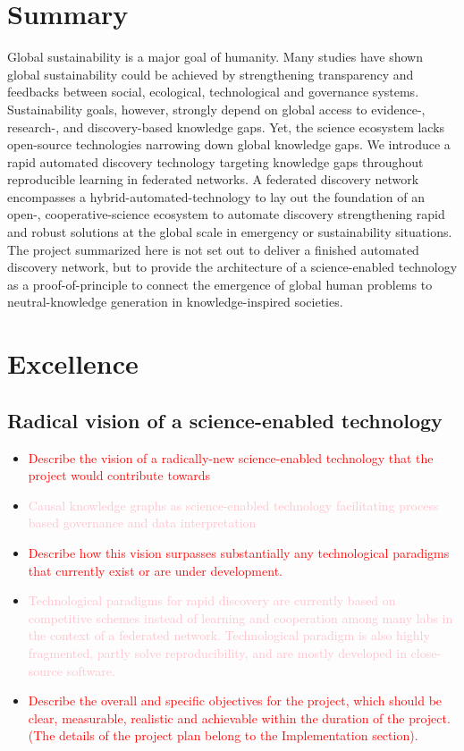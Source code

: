 \documentclass[12pt, a4paper]{article} %
\begin{document}
\section*{{\bf Summary}} Global sustainability is a major goal of
humanity. Many studies have shown global sustainability could be
achieved by strengthening transparency and feedbacks between social,
ecological, technological and governance systems. Sustainability
goals, however, strongly depend on global access to evidence-,
research-, and discovery-based knowledge gaps. Yet, the science
ecosystem lacks open-source technologies narrowing down global
knowledge gaps. We introduce a rapid automated discovery technology
targeting knowledge gaps throughout reproducible learning in federated
networks. A federated discovery network encompasses a
hybrid-automated-technology to lay out the foundation of an open-,
cooperative-science ecosystem to automate discovery strengthening
rapid and robust solutions at the global scale in emergency or
sustainability situations. The project summarized here is not set out
to deliver a finished automated discovery network, but to provide the
architecture of a science-enabled technology as a proof-of-principle
to connect the emergence of global human problems to neutral-knowledge
generation in knowledge-inspired societies.
\section{Excellence}
\subsection{Radical vision of a science-enabled technology}

\begin{itemize}
\item \textcolor{red}{Describe the vision of a radically-new science-enabled
    technology that the project would contribute towards}
\item \textcolor{pink}{Causal knowledge graphs as science-enabled
    technology facilitating process based governance and data
    interpretation}
\item \textcolor{red}{Describe how this vision surpasses substantially
    any technological paradigms that currently exist or are under
    development.}
\item \textcolor{pink}{Technological paradigms for rapid discovery are
    currently based on competitive schemes instead of learning and
    cooperation among many labs in the context of a federated
    network. Technological paradigm is also highly fragmented, partly
    solve reproducibility, and are mostly developed in close-source
    software.}
\item \textcolor{red}{Describe the overall and specific objectives for
    the project, which should be clear, measurable, realistic and
    achievable within the duration of the project. (The details of the
    project plan belong to the Implementation section).}
\end{itemize}
\end{document}
